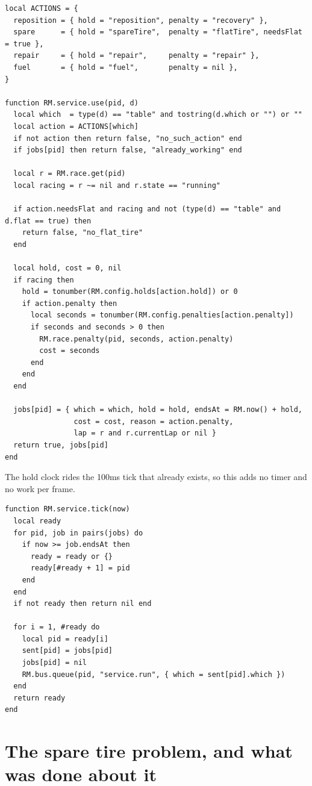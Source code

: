 \documentclass[11pt,a4paper]{article}
\begin{document}
\begin{lstlisting}
local ACTIONS = {
  reposition = { hold = "reposition", penalty = "recovery" },
  spare      = { hold = "spareTire",  penalty = "flatTire", needsFlat = true },
  repair     = { hold = "repair",     penalty = "repair" },
  fuel       = { hold = "fuel",       penalty = nil },
}

function RM.service.use(pid, d)
  local which  = type(d) == "table" and tostring(d.which or "") or ""
  local action = ACTIONS[which]
  if not action then return false, "no_such_action" end
  if jobs[pid] then return false, "already_working" end

  local r = RM.race.get(pid)
  local racing = r ~= nil and r.state == "running"

  if action.needsFlat and racing and not (type(d) == "table" and d.flat == true) then
    return false, "no_flat_tire"
  end

  local hold, cost = 0, nil
  if racing then
    hold = tonumber(RM.config.holds[action.hold]) or 0
    if action.penalty then
      local seconds = tonumber(RM.config.penalties[action.penalty])
      if seconds and seconds > 0 then
        RM.race.penalty(pid, seconds, action.penalty)
        cost = seconds
      end
    end
  end

  jobs[pid] = { which = which, hold = hold, endsAt = RM.now() + hold,
                cost = cost, reason = action.penalty,
                lap = r and r.currentLap or nil }
  return true, jobs[pid]
end
\end{lstlisting}

The hold clock rides the 100ms tick that already exists, so this adds no timer
and no work per frame.

\begin{lstlisting}
function RM.service.tick(now)
  local ready
  for pid, job in pairs(jobs) do
    if now >= job.endsAt then
      ready = ready or {}
      ready[#ready + 1] = pid
    end
  end
  if not ready then return nil end

  for i = 1, #ready do
    local pid = ready[i]
    sent[pid] = jobs[pid]
    jobs[pid] = nil
    RM.bus.queue(pid, "service.run", { which = sent[pid].which })
  end
  return ready
end
\end{lstlisting}

\section{The spare tire problem, and what was done about it}
\end{document}
